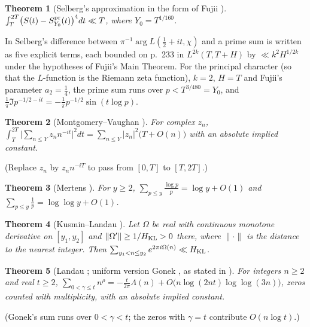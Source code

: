 \documentclass[preprint,12pt]{elsarticle}
\numberwithin{equation}{section}
\theoremstyle{plain}
\newtheorem{theorem}{Theorem}[section]
\theoremstyle{definition}
\theoremstyle{remark}
\begin{document}
\begin{theorem}[Selberg's approximation in the form of Fujii {\cite[\S3, pp.~232--233]{Fujii1974}}]\label{thm:known_selberg_approx}
$\int_T^{2T}\bigl(S(t)-S^{\rm pr}_{Y_0}(t)\bigr)^4dt\ll T$, where $Y_0=T^{1/160}$.
\end{theorem}
In \cite[\S3]{Fujii1974} Selberg's difference between $\pi^{-1}\arg L(\frac12+it,\chi)$ and a prime sum is written as five explicit terms, each bounded on p.~233 in $L^{2k}(T,T+H)$ by $\ll k^2H^{1/2k}$ under the hypotheses of Fujii's Main Theorem. For the principal character (so that the $L$-function is the Riemann zeta function), $k=2$, $H=T$ and Fujii's parameter $a_2=\frac14$, the prime sum runs over $p<T^{3/480}=Y_0$, and $\frac1\pi\Im p^{-1/2-it}=-\frac1\pi p^{-1/2}\sin(t\log p)$.

\begin{theorem}[Montgomery--Vaughan {\cite[Cor.~3]{MontgomeryVaughan1974}}]\label{thm:known_MV}
For complex $z_n$, $\int_T^{2T}\bigl|\sum_{n\le Y}z_nn^{-it}\bigr|^2dt=\sum_{n\le Y}|z_n|^2\bigl(T+O(n)\bigr)$ with an absolute implied constant.
\end{theorem}
(Replace $z_n$ by $z_nn^{-iT}$ to pass from $[0,T]$ to $[T,2T]$.)

\begin{theorem}[Mertens {\cite{Mertens1874}}]\label{thm:known_mertens}
For $y\ge2$, $\sum_{p\le y}\frac{\log p}p=\log y+O(1)$ and $\sum_{p\le y}\frac1p=\log\log y+O(1)$.
\end{theorem}

\begin{theorem}[Kusmin--Landau {\cite[Thm.~2.1]{GrahamKolesnik1991}}]\label{thm:known_KL}
Let $\Omega$ be real with continuous monotone derivative on $[y_1,y_2]$ and $\|\Omega'\|\ge1/H_{\rm KL}>0$ there, where $\|\cdot\|$ is the distance to the nearest integer. Then $\sum_{y_1<n\le y_2}e^{2\pi i\Omega(n)}\ll H_{\rm KL}$.
\end{theorem}

\begin{theorem}[Landau {\cite{Landau1912}}; uniform version Gonek {\cite{Gonek1993}}, as stated in {\cite[(1.1)]{Aryan2022}}]\label{thm:known_landau}
For integers $n\ge2$ and real $t\ge2$, $\sum_{0<\gamma\le t}n^{\rho}=-\frac t{2\pi}\Lambda(n)+O\bigl(n\log(2nt)\log\log(3n)\bigr)$, zeros counted with multiplicity, with an absolute implied constant.
\end{theorem}
(Gonek's sum runs over $0<\gamma<t$; the zeros with $\gamma=t$ contribute $O(n\log t)$.)
\end{document}
